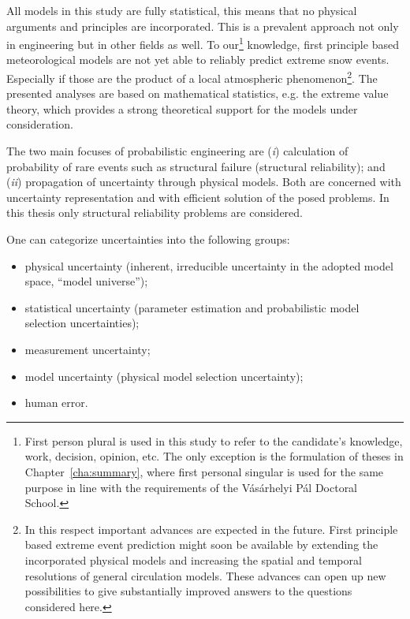 All models in this study are fully statistical, this means that no physical arguments and principles are incorporated. This is a prevalent approach not only in engineering but in other fields as well. To our\footnote{First person plural is used in this study to refer to the candidate's knowledge, work, decision, opinion, etc. The only exception is the formulation of theses in Chapter~\ref{cha:summary}, where first personal singular is used for the same purpose in line with the requirements of the Vásárhelyi Pál Doctoral School.} knowledge, first principle based meteorological models are not yet able to reliably predict extreme snow events. Especially if those are the product of a local atmospheric phenomenon\footnote{In this respect important advances are expected in the future. First principle based extreme event prediction might soon be available by extending the incorporated physical models and increasing the spatial and temporal resolutions of general circulation models. These advances can open up new possibilities to give substantially improved answers to the questions considered here.}. The presented analyses are based on mathematical statistics, e.g. the extreme value theory, which provides a strong theoretical support for the models under consideration.

The two main focuses of probabilistic engineering are (\textit{i}) calculation of probability of rare events such as structural failure (structural reliability); and (\textit{ii}) propagation of uncertainty through physical models. Both are concerned with uncertainty representation and with efficient solution of the posed problems. In this thesis only structural reliability problems are considered.

One can categorize uncertainties into the following groups:
\begin{itemize}
	\item physical uncertainty (inherent, irreducible uncertainty in the adopted model space, ``model universe'');
	\item statistical uncertainty (parameter estimation and probabilistic model selection uncertainties);
	\item measurement uncertainty;
	\item model uncertainty (physical model selection uncertainty);
	\item human error.
\end{itemize}

